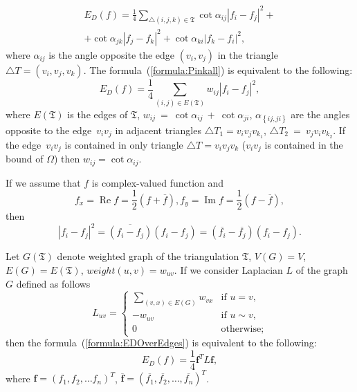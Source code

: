 \documentclass{article}
\newcommand{\conjugate}{\overline}
\newcommand{\re}{\operatorname{Re}}
\newcommand{\im}{\operatorname{Im}}
\begin{document}
\begin{multline}
\label{formula:Pinkall}
  E_D(f) = \frac{1}{4} \sum_{\triangle (i, j, k) \in \mathfrak{T}} \cot{\alpha_{ij}}|f_i - f_j|^2 + \\
  + \cot{\alpha_{jk}}|f_j - f_k|^2 + \cot{\alpha_{ki}}|f_k - f_i|^2,
\end{multline}
where $\alpha_{ij}$ is the angle opposite the edge $(v_i, v_j)$ in the triangle $\triangle T = (v_i, v_j, v_k)$. The formula~(\ref{formula:Pinkall}) is equivalent to the following:
\begin{equation}
\label{formula:EDOverEdges}
  E_D(f) = \frac{1}{4} \sum_{\left( i, j \right) \in E\left(\mathfrak{T}\right)}{w_{ij} |f_i - f_j|^2}, 
\end{equation}
where $E(\mathfrak{T})$ is the edges of $\mathfrak{T}$, $w_{ij}~=~\cot\alpha_{ij}~+~\cot\alpha_{ji}$, $\alpha_{\left\{{ij, ji}\right\}}$ are the angles opposite 
to the edge~$v_i v_j$ in adjacent triangles $\triangle T_1=v_i v_j v_{k_1}$, $\triangle T_2~=~v_j v_i v_{k_2}$. If the edge~$v_i v_j$ is contained in only triangle $\triangle T=v_i v_j v_k$ 
($v_i v_j$ is contained in the bound of $\Omega$) then $w_{ij} = \cot \alpha_{ij}$.

If we assume that $f$ is complex-valued function and 
$$f_x=\re{f}=\frac{1}{2}\left(f + \conjugate{f}\right), f_y=\im{f}=\frac{1}{2}\left(f - \conjugate{f}\right),$$ 
then $$|f_i - f_j|^2 = \conjugate{(f_i - f_j)}(f_i - f_j) = (\conjugate{f_i} - \conjugate{f_j})(f_i - f_j).$$ 

Let $G(\mathfrak{T})$ denote weighted graph of the triangulation $\mathfrak{T}$, $V(G) = V$, $E(G) = E(\mathfrak{T})$, $weight(u, v) = w_{uv}$. If we consider Laplacian $L$ of the graph $G$ defined as follows 
$$L_{uv} = \begin{cases}
  \sum_{(v, x) \in E(G)}{w_{vx}}&\text{if $u = v,$} \\
  -w_{uv}&\text{if $u \sim v,$} \\
  0 &\text{otherwise;}
\end{cases}
$$ then the formula~(\ref{formula:EDOverEdges}) is equivalent to the following:
\begin{equation}
\label{formula:EDOverLaplacian}
E_D(f) = \frac{1}{4} \mathbf{f}^T L \mathbf{f},
\end{equation}
where $\mathbf{f} = (f_1, f_2, \dots f_n)^T$, $\conjugate{\mathbf{f}} = (\conjugate{f_1}, \conjugate{f_2}, \dots, \conjugate{f_n})^T$.
\end{document}
